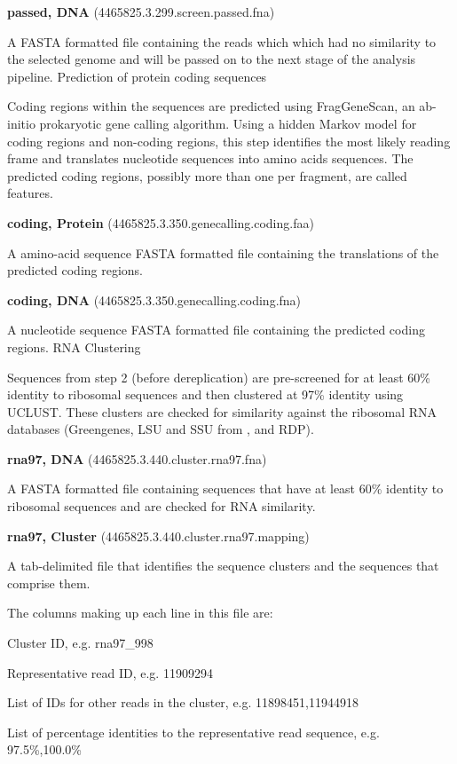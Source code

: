 \documentclass[12pt,fullpage]{report}
\begin{document}
\begin{appendices}
\begin{mdframed}
\textbf{passed, DNA} (4465825.3.299.screen.passed.fna)

A FASTA formatted file containing the reads which which had no similarity to the selected genome and will be passed on to the next stage of the analysis pipeline.
Prediction of protein coding sequences

Coding regions within the sequences are predicted using FragGeneScan, an ab-initio prokaryotic gene calling algorithm. Using a hidden Markov model for coding regions and non-coding regions, this step identifies the most likely reading frame and translates nucleotide sequences into amino acids sequences. The predicted coding regions, possibly more than one per fragment, are called features.

\textbf{coding, Protein} (4465825.3.350.genecalling.coding.faa)

A amino-acid sequence FASTA formatted file containing the translations of the predicted coding regions.

\textbf{coding, DNA} (4465825.3.350.genecalling.coding.fna)

A nucleotide sequence FASTA formatted file containing the predicted coding regions.
RNA Clustering

Sequences from step 2 (before dereplication) are pre-screened for at least 60\% identity to ribosomal sequences and then clustered at 97\% identity using UCLUST. These clusters are checked for similarity against the ribosomal RNA databases (Greengenes\cite{GREENGENES}, LSU and SSU from \cite{SILVA}, and RDP\cite{RDP}).

\textbf{rna97, DNA} (4465825.3.440.cluster.rna97.fna)

A FASTA formatted file containing sequences that have at least 60\% identity to ribosomal sequences and are checked for RNA similarity.

\textbf{rna97, Cluster} (4465825.3.440.cluster.rna97.mapping)

A tab-delimited file that identifies the sequence clusters and the sequences that comprise them.

The columns making up each line in this file are:

    Cluster ID, e.g. rna97\_998

    Representative read ID, e.g. 11909294

    List of IDs for other reads in the cluster, e.g. 11898451,11944918

    List of percentage identities to the representative read sequence, e.g. 97.5\%,100.0\%


\end{mdframed}
\end{appendices}
\end{document}
